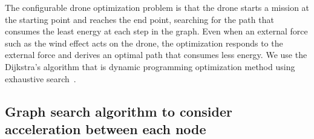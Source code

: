 \documentclass[journal]{./template/IEEEtran}
\begin{document}
The configurable drone optimization problem is that the drone starts a mission at the starting point and reaches the end point, searching for the path that consumes the least energy at each step in the graph. 
Even when an external force such as the wind effect acts on the drone, the optimization responds to the external force and derives an optimal path that consumes less energy.
We use the Dijkstra's algorithm that is dynamic programming optimization method using exhaustive search~\cite{ref_19}. 





\subsection{Graph search algorithm to consider acceleration between each node}
\end{document}
